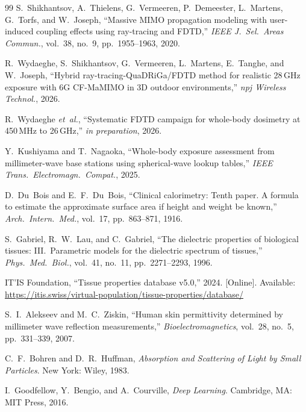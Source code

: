 \documentclass[11pt,a4paper]{article}
\theoremstyle{definition}      %
\begin{document}
\begin{thebibliography}{99}
  S.~Shikhantsov, A.~Thielens, G.~Vermeeren, P.~Demeester, L.~Martens,
  G.~Torfs, and W.~Joseph, ``Massive MIMO propagation modeling with
  user-induced coupling effects using ray-tracing and FDTD,'' \textit{IEEE J.\
  Sel.\ Areas Commun.}, vol.~38, no.~9, pp.~1955--1963, 2020.

  R.~Wydaeghe, S.~Shikhantsov, G.~Vermeeren, L.~Martens, E.~Tanghe, and
  W.~Joseph, ``Hybrid ray-tracing-{QuaDRiGa}/{FDTD} method for realistic
  28\,GHz exposure with 6G CF-MaMIMO in 3D outdoor environments,''
  \textit{npj Wireless Technol.}, 2026.

  R.~Wydaeghe \textit{et~al.}, ``Systematic FDTD campaign for whole-body
  dosimetry at 450\,MHz to 26\,GHz,'' \emph{in preparation}, 2026.

  Y.~Kushiyama and T.~Nagaoka, ``Whole-body exposure assessment from
  millimeter-wave base stations using spherical-wave lookup tables,''
  \textit{IEEE Trans.\ Electromagn.\ Compat.}, 2025.

  D.~Du~Bois and E.~F.~Du~Bois, ``Clinical calorimetry: Tenth paper.
  A formula to estimate the approximate surface area if height and weight be
  known,'' \textit{Arch.\ Intern.\ Med.}, vol.~17, pp.~863--871, 1916.
  \doi{10.1001/archinte.1916.00080130010002}

  S.~Gabriel, R.~W.~Lau, and C.~Gabriel, ``The dielectric properties of
  biological tissues: III.\ Parametric models for the dielectric spectrum of
  tissues,'' \textit{Phys.\ Med.\ Biol.}, vol.~41, no.~11, pp.~2271--2293,
  1996.

  {IT'IS Foundation}, ``Tissue properties database v5.0,'' 2024. [Online].
  Available: \url{https://itis.swiss/virtual-population/tissue-properties/database/}

  S.~I.~Alekseev and M.~C.~Ziskin, ``Human skin permittivity determined by
  millimeter wave reflection measurements,'' \textit{Bioelectromagnetics},
  vol.~28, no.~5, pp.~331--339, 2007.

  C.~F.~Bohren and D.~R.~Huffman, \textit{Absorption and Scattering of Light
  by Small Particles}. New York: Wiley, 1983.

  I.~Goodfellow, Y.~Bengio, and A.~Courville, \textit{Deep Learning}.
  Cambridge, MA: MIT Press, 2016.


\end{thebibliography}
\end{document}
